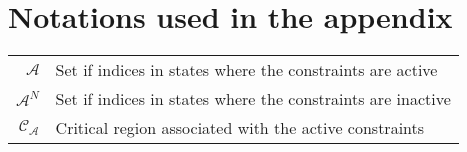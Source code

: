 \newpage
\section{Notations used in the appendix}
		
  \begin{scriptsize}
\begin{tabularx}{\textwidth}{r|X}
$\mathcal{A}$               & Set if indices in states where the constraints are active\\
$\mathcal{A}^N$               & Set if indices in states where the constraints are inactive\\
$\mathcal{C}_{\mathcal{A}}$               & Critical region associated with the active constraints\\

\end{tabularx}
\end{scriptsize}

